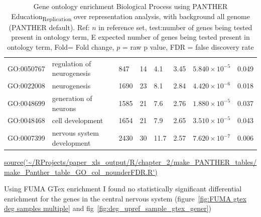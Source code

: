\begin{table}[ht]
\begin{adjustbox}{width=\textwidth}
\begin{tabular}{llllllll}
  GO:0050767 & regulation of neurogenesis  & 847 & 14 & 4.1 & 3.45 & $5.840 \times 10^{-5}$ & 0.049 \\ 
  GO:0022008 & neurogenesis  & 1690 & 23 & 8.1 & 2.84 & $4.420 \times 10^{-6}$ & 0.018 \\ 
  GO:0048699 & generation of neurons  & 1585 & 21 & 7.6 & 2.76 & $1.880 \times 10^{-5}$ & 0.037 \\ 
  GO:0048468 & cell development  & 1654 & 21 & 7.9 & 2.65 & $3.510 \times 10^{-5}$ & 0.043 \\ 
  GO:0007399 & nervous system development  & 2430 & 30 & 11.7 & 2.57 & $7.620 \times 10^{-7}$ & 0.006 \\ 
   \bottomrule
\end{tabular}
\end{adjustbox}
\caption{Gene ontology enrichment Biological Process using PANTHER Education\textsubscript{Replication} over representation analysis, with background all genome (PANTHER default). Ref: $n$ in reference set, test:number of genes being tested present in ontology term, E expected number of genes being tested present in ontology term, Fold= Fold change, $p$ = raw p value, FDR = false discovery rate} \tiny\url{source('~/RProjects/paper_xls_output/R/chapter_2/make_PANTHER_tables/make_Panther_table_GO_col_nounderFDR.R')}
\label{tab:GO biological process complete Education Replication FDRover represenation only}
\end{table}


Using FUMA GTex enrichment I found no statistically significant differential enrichment for the genes in the central nervous system (figure~\ref{fig:FUMA gtex deg samples multiple} and fig~\ref{fig:deg_upref_sample_gtex_gener})



    


